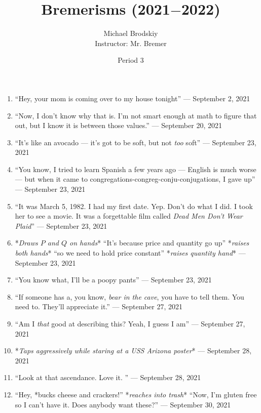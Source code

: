 \documentclass[12pt]{article}
\title{Bremerisms (2021$-$2022)}
\date{Period 3}
\author{Michael Brodskiy\\ \small Instructor: Mr. Bremer}
\begin{document}
\maketitle

\begin{enumerate}

  \item “Hey, your mom is coming over to my house tonight” — September 2, 2021

  \item “Now, I don't know why that is. I'm not smart enough at math to figure that out, but I know it is between those values.” — September 20, 2021

  \item ``It's like an avocado — it's got to be soft, but not \textit{too} soft'' — September 23, 2021

  \item ``You know, I tried to learn Spanish a few years ago — English is much worse — but when it came to congregations-congreg-conju-conjugations, I gave up'' — September 23, 2021

  \item ``It was March 5, 1982. I had my first date. Yep. Don't do what I did. I took her to see a movie. It was a forgettable film called \textit{Dead Men Don't Wear Plaid}'' — September 23, 2021

  \item *\textit{Draws $P$ and $Q$ on hands}* ``It's because price and quantity go up'' *\textit{raises both hands}* ``so we need to hold price constant'' *\textit{raises quantity hand}* — September 23, 2021

  \item ``You know what, I'll be a poopy pants'' — September 23, 2021

  \item “If someone has a, you know, \textit{bear in the cave}, you have to tell them. You need to. They'll appreciate it.” — September 27, 2021

  \item “Am I \textit{that} good at describing this? Yeah, I guess I am” — September 27, 2021

  \item *\textit{Taps aggressively while staring at a USS Arizona poster}* — September 28, 2021

  \item “Look at that ascendance. Love it. ” — September 28, 2021

  \item “Hey, *bucks cheese and crackers!” *\textit{reaches into trash}* “Now, I'm gluten free so I can't have it. Does anybody want these?” — September 30, 2021


\end{enumerate}
\end{document}
